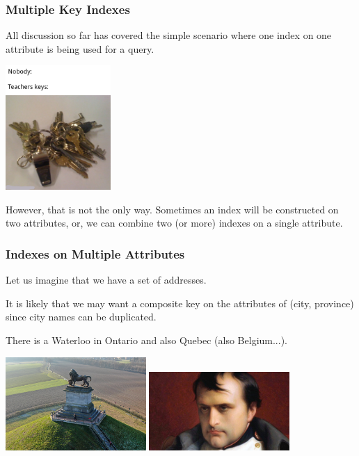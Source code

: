 \begin{frame}
\frametitle{Multiple Key Indexes}

All discussion so far has covered the simple scenario where one index on one attribute is being used for a query. 

\begin{center}
	\includegraphics[width=0.3\textwidth]{images/keys.png}
\end{center}

However, that is not the only way. Sometimes an index will be constructed on two attributes, or, we can combine two (or more) indexes on a single attribute. 


\end{frame}

\begin{frame}
\frametitle{Indexes on Multiple Attributes}

Let us imagine that we have a set of addresses. 

It is likely that we may want a composite key on the attributes of (city, province) since city names can be duplicated. 

There is a Waterloo in Ontario and also Quebec (also Belgium...). 

\begin{center}
	\includegraphics[width=0.4\textwidth]{images/belgium.jpg}
	\includegraphics[width=0.4\textwidth]{images/sad-napoleon.jpg}
\end{center}


\end{frame}

